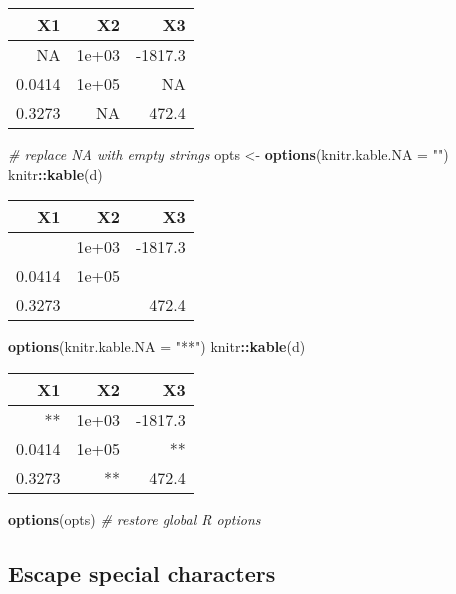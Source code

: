 \documentclass[
  11pt,
]{krantz}
\newenvironment{Shaded}{\begin{snugshade}}{\end{snugshade}}
\newcommand{\CommentTok}[1]{\textcolor[rgb]{0.37,0.37,0.37}{\textit{#1}}}
\newcommand{\DataTypeTok}[1]{\textcolor[rgb]{0.27,0.27,0.27}{#1}}
\newcommand{\KeywordTok}[1]{\textcolor[rgb]{0.27,0.27,0.27}{\textbf{#1}}}
\newcommand{\NormalTok}[1]{#1}
\newcommand{\OperatorTok}[1]{\textcolor[rgb]{0.43,0.43,0.43}{\textbf{#1}}}
\newcommand{\StringTok}[1]{\textcolor[rgb]{0.5,0.5,0.5}{#1}}
\begin{document}
\begin{tabular}{r|r|r}
\hline
X1 & X2 & X3\\
\hline
NA & 1e+03 & -1817.3\\
\hline
0.0414 & 1e+05 & NA\\
\hline
0.3273 & NA & 472.4\\
\hline
\end{tabular}

\begin{Shaded}
\begin{Highlighting}[]
\CommentTok{# replace NA with empty strings}
\NormalTok{opts <-}\StringTok{ }\KeywordTok{options}\NormalTok{(}\DataTypeTok{knitr.kable.NA =} \StringTok{""}\NormalTok{)}
\NormalTok{knitr}\OperatorTok{::}\KeywordTok{kable}\NormalTok{(d)}
\end{Highlighting}
\end{Shaded}

\begin{tabular}{r|r|r}
\hline
X1 & X2 & X3\\
\hline
 & 1e+03 & -1817.3\\
\hline
0.0414 & 1e+05 & \\
\hline
0.3273 &  & 472.4\\
\hline
\end{tabular}

\begin{Shaded}
\begin{Highlighting}[]
\KeywordTok{options}\NormalTok{(}\DataTypeTok{knitr.kable.NA =} \StringTok{"**"}\NormalTok{)}
\NormalTok{knitr}\OperatorTok{::}\KeywordTok{kable}\NormalTok{(d)}
\end{Highlighting}
\end{Shaded}

\begin{tabular}{r|r|r}
\hline
X1 & X2 & X3\\
\hline
** & 1e+03 & -1817.3\\
\hline
0.0414 & 1e+05 & **\\
\hline
0.3273 & ** & 472.4\\
\hline
\end{tabular}

\begin{Shaded}
\begin{Highlighting}[]
\KeywordTok{options}\NormalTok{(opts)  }\CommentTok{# restore global R options}
\end{Highlighting}
\end{Shaded}

\hypertarget{escape-special-characters}{%
\subsection{Escape special characters}\label{escape-special-characters}}
\end{document}
